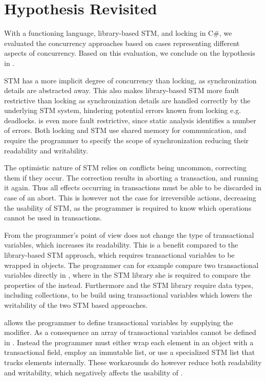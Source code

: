\section{Hypothesis Revisited}
With a functioning \stmname language, library-based \ac{STM}, and locking in C\#, we evaluated the concurrency approaches based on cases representing different aspects of concurrency. Based on this evaluation, we conclude on the hypothesis in .

\ac{STM} has a more implicit degree of concurrency than locking, as synchronization details are abstracted away. This also makes library-based \ac{STM} more fault restrictive than locking as synchronization details are handled correctly by the underlying \ac{STM} system, hindering potential errors known from locking e.g. deadlocks. \stmname is even more fault restrictive, since static analysis identifies a number of errors. Both locking and \ac{STM} use shared memory for communication, and require the programmer to specify the scope of synchronization reducing their readability and writability.

The optimistic nature of \ac{STM} relies on conflicts being uncommon,  correcting them if they occur. The correction results in aborting a transaction, and running it again. Thus all effects occurring in transactions must be able to be discarded in case of an abort. This is however not the case for irreversible actions, decreasing the usability of \ac{STM}, as the programmer is required to know which operations cannot be used in transactions.

From the programmer's point of view \stmname does not change the type of transactional variables, which increases its readability. This is a benefit compared to the library-based \ac{STM} approach, which requires transactional variables to be wrapped in  objects. The programmer can for example compare two transactional variables directly in \stmname, where in the \ac{STM} library she is required to compare the  properties of the  instead. Furthermore \stmname and the \ac{STM} library require data types, including collections, to be build using transactional variables which lowers the writability of the two \ac{STM} based approaches.  %

\stmname allows the programmer to define transactional variables by supplying the  modifier. As a consequence an array of transactional variables cannot be defined in \stmname. Instead the programmer must either wrap each element in an object with a transactional field, employ an immutable list, or use a specialized \ac{STM} list that tracks elements internally. These workarounds do however reduce both readability and writability, which negatively affects the usability of \stmname.

